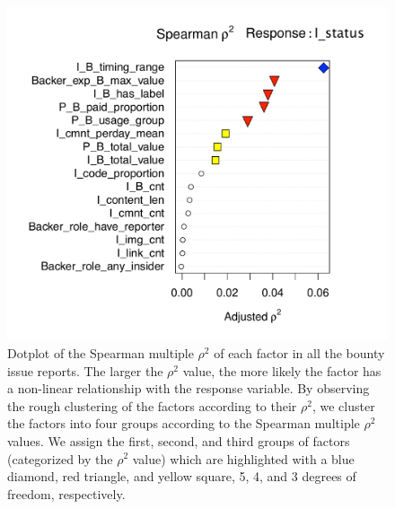 \documentclass[10pt,journal,compsoc]{IEEEtran}
\begin{document}
\begin{appendices}
\begin{enumerate}
\begin{figure}[t]
        \label{FINAL_RQ3_hie}
        \vspace{-0.2in}
      \end{figure}
      \begin{figure}[h]
        \centering\includegraphics[width=\columnwidth]{pics/rq3/rq3_spearman}
        \caption{Dotplot of the Spearman multiple ${\rho}^2$  of each factor in all the bounty issue reports. The larger the ${\rho}^2$ value, the more likely the factor has a non-linear relationship with the response variable. By observing the rough clustering of the factors according to their $\rho^2$, we cluster the factors into four groups according
        to the Spearman multiple $\rho^2$  values. We assign the first, second, and third groups of factors (categorized by the ${\rho}^2$ value) which are highlighted with a blue diamond, red triangle, and yellow square, 5, 4, and 3 degrees of freedom, respectively.  }
        \label{fig:rq3_spearman}
      \end{figure}


\end{enumerate}
\end{appendices}
\end{document}
